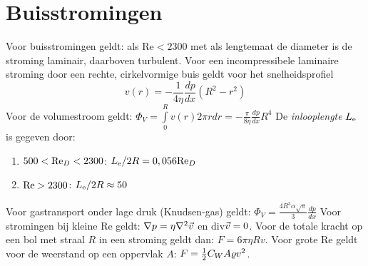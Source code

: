 \section{Buisstromingen}
Voor buisstromingen geldt: als Re$<2300$ met als lengtemaat de diameter is de
stroming laminair, daarboven turbulent. Voor een incompressibele laminaire
stroming door een rechte, cirkelvormige buis geldt voor het snelheidsprofiel
\[
v(r)=-\frac{1}{4\eta}\frac{dp}{dx}(R^2-r^2)
\]
Voor de volumestroom geldt:
$\displaystyle\Phi_V=\int\limits_0^R v(r)2\pi rdr=-\frac{\pi}{8\eta}\frac{dp}{dx}R^4$
\npar
De {\it inlooplengte} $L_{\rm e}$ is gegeven door:
\begin{enumerate}
\item $500<{\rm Re}_D<2300$: $L_{\rm e}/2R=0,056{\rm Re}_D$
\item ${\rm Re}>2300$: $L_{\rm e}/2R\approx50$
\end{enumerate}
Voor gastransport onder lage druk (Knudsen-gas) geldt:
$\displaystyle\Phi_V=\frac{4R^3\alpha\sqrt{\pi}}{3}\frac{dp}{dx}$
\npar
Voor stromingen bij kleine Re geldt: $\nabla p=\eta\nabla^2\vec{v}$ en div$\vec{v}=0$.
Voor de totale kracht op een bol met straal $R$ in een stroming geldt dan:
$F=6\pi\eta Rv$. Voor grote Re geldt voor de weerstand op een oppervlak $A$:
$F=\mbox{$\frac{1}{2}$} C_WA\varrho v^2$.

